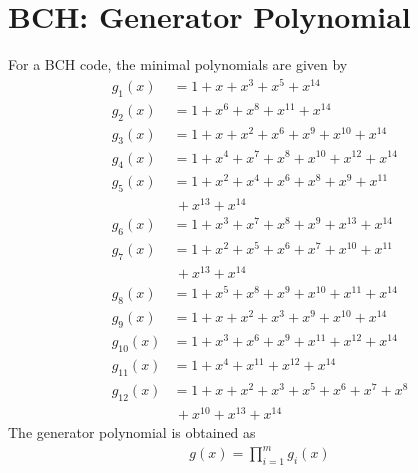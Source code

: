 \documentclass[journal,12pt,twocolumn]{IEEEtran}
\renewcommand\thesection{\arabic{section}}
\begin{document}
\section{BCH: Generator Polynomial}
For a BCH code, the minimal polynomials are given by 
\begin{align}
g_1(x)&=1+x+x^3+x^5+x^{14}\\
g_2(x)&=1+x^6+x^8+x^{11}+x^{14}\\
g_3(x)&=1+x+x^2+x^6+x^9+x^{10}+x^{14}\\
g_4(x)&=1+x^4+x^7+x^8+x^10+x^{12}+x^{14}\\
g_5(x)&=1+x^2+x^4+x^6+x^8+x^9+x^{11}
\nonumber \\
&\,+x^{13}+x^{14}\\
g_6(x)&=1+x^3+x^7+x^8+x^9+x^{13}+x^{14}\\
g_7(x)&=1+x^2+x^5+x^6+x^7+x^{10}+x^{11}
\nonumber \\
&\,+x^{13}+x^{14}\\
g_8(x)&=1+x^5+x^8+x^9+x^{10}+x^{11}+x^{14}\\
g_9(x)&=1+x+x^2+x^3+x^9+x^{10}+x^{14}\\
g_{10}(x)&=1+x^3+x^6+x^9+x^{11}+x^{12}+x^{14}\\
g_{11}(x)&=1+x^4+x^{11}+x^{12}+x^{14}\\
g_{12}(x)&=1+x+x^2+x^3+x^5+x^6+x^7+x^8
\nonumber \\
&\,+x^{10}+x^{13}+x^{14}
\end{align}
The generator polynomial is obtained as
\begin{align}
g(x) =\prod_{i = 1}^{m}g_i(x)
\end{align}


\end{document}
